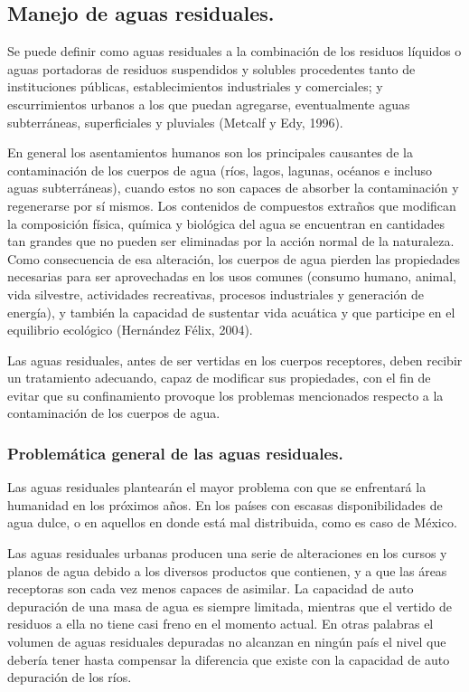 \subsection{Manejo de aguas residuales.}

Se puede definir como aguas residuales a la combinación de los residuos
líquidos o aguas portadoras de residuos suspendidos y solubles procedentes tanto de
instituciones públicas, establecimientos industriales y comerciales; y escurrimientos
urbanos a los que puedan agregarse, eventualmente aguas subterráneas, superficiales
y pluviales (Metcalf y Edy, 1996).


En general los asentamientos humanos son los principales causantes de la
contaminación de los cuerpos de agua (ríos, lagos, lagunas, océanos e incluso aguas
subterráneas), cuando estos no son capaces de absorber la contaminación y
regenerarse por sí mismos. Los contenidos de compuestos extraños que modifican la
composición física, química y biológica del agua se encuentran en cantidades tan
grandes que no pueden ser eliminadas por la acción normal de la naturaleza. Como
consecuencia de esa alteración, los cuerpos de agua pierden las propiedades
necesarias para ser aprovechadas en los usos comunes (consumo humano, animal,
vida silvestre, actividades recreativas, procesos industriales y generación de energía), y
también la capacidad de sustentar vida acuática y que participe en el equilibrio
ecológico (Hernández Félix, 2004).


Las aguas residuales, antes de ser vertidas en los cuerpos receptores, deben
recibir un tratamiento adecuando, capaz de modificar sus propiedades, con el fin de
evitar que su confinamiento provoque los problemas mencionados respecto a la
contaminación de los cuerpos de agua.

\subsubsection{Problemática general de las aguas residuales.}
Las aguas residuales plantearán el mayor problema con que se enfrentará la
humanidad en los próximos años. En los países con escasas disponibilidades de agua
dulce, o en aquellos en donde está mal distribuida, como es caso de México.

Las aguas residuales urbanas producen una serie de alteraciones en los cursos y
planos de agua debido a los diversos productos que contienen, y a que las áreas
receptoras son cada vez menos capaces de asimilar. La capacidad de auto depuración
de una masa de agua es siempre limitada, mientras que el vertido de residuos a ella no
tiene casi freno en el momento actual. En otras palabras el volumen de aguas
residuales depuradas no alcanzan en ningún país el nivel que debería tener hasta
compensar la diferencia que existe con la capacidad de auto depuración de los ríos.


